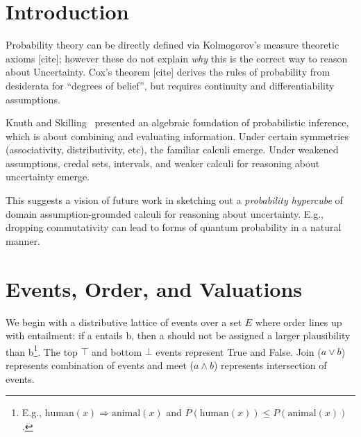 \documentclass[11pt]{article}
\theoremstyle{definition}
\theoremstyle{remark}
\begin{document}
\begin{abstract}
\end{abstract}

\section{Introduction}
Probability theory can be directly defined via Kolmogorov's measure theoretic axioms [cite]; however these do not explain \emph{why} this is the correct way to reason about Uncertainty.
Cox's theorem [cite] derives the rules of probability from desiderata for ``degrees of belief'', but requires continuity and differentiability assumptions.

Knuth and Skilling~\cite{ksfoi12} presented an algebraic foundation of probabilistic inference, which is about combining and evaluating information.
Under certain symmetries (associativity, distributivity, etc), the familiar calculi emerge.
Under weakened assumptions, credal sets, intervals, and weaker calculi for reasoning about uncertainty emerge.  %

This suggests a vision of future work in sketching out a \emph{probability hypercube} of domain assumption-grounded calculi for reasoning about uncertainty.
E.g., dropping commutativity can lead to forms of quantum probability in a natural manner.

\section{Events, Order, and Valuations}
We begin with a distributive lattice of events over a set $E$ where order lines up with entailment: if a entails b, then a should not be assigned a larger plausibility than b\footnote{E.g., $\text{human}(x) \Rightarrow \text{animal}(x)$ and $P(\text{human}(x)) \leq P(\text{animal}(x))$.}.
The top $\top$ and bottom $\bot$ events represent True and False.  Join ($a \vee b$) represents combination of events and meet ($a \wedge b$) represents intersection of events.
\end{document}
